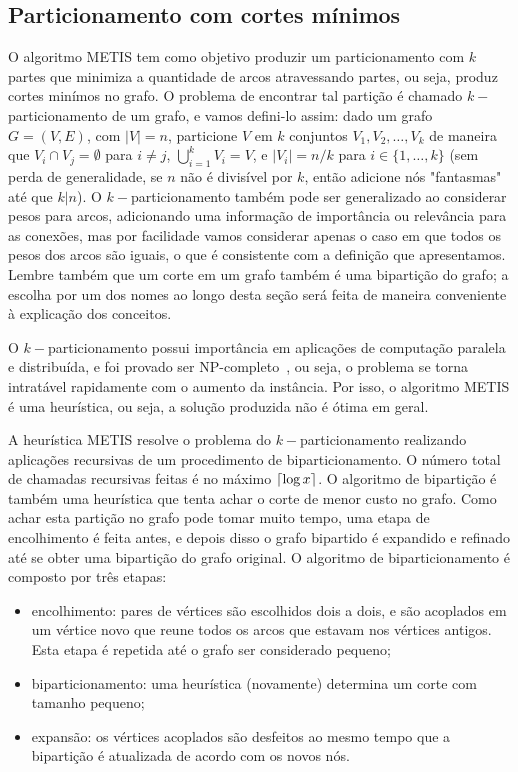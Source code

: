 \documentclass[conference]{IEEEtran}
\DeclarePairedDelimiter\ceil{\lceil}{\rceil}
\begin{document}
\subsection{Particionamento com cortes mínimos}
O algoritmo METIS tem como objetivo produzir um particionamento com
$k$ partes que minimiza a quantidade de arcos atravessando partes, ou
seja, produz cortes minímos no grafo. O problema de encontrar tal
partição é chamado $k-$particionamento de um grafo, e vamos defini-lo
assim: dado um grafo $G = (V, E)$, com $|V| = n$, particione $V$ em $k$
conjuntos $V_1, V_2, \ldots, V_k$ de maneira que
$V_i \cap V_j = \emptyset$ para $i \neq j$, $\bigcup_{i = 1}^k V_i = V$,
e $|V_i| = n / k$ para $i \in \{1, \ldots, k\}$ (sem perda de
generalidade, se $n$ não é divisível por $k$, então adicione nós
"fantasmas" até que $k | n$). O $k-$particionamento também pode ser
generalizado ao considerar pesos para arcos, adicionando uma informação
de importância ou relevância para as conexões, mas por facilidade vamos
considerar apenas o caso em que todos os pesos dos arcos são iguais, o
que é consistente com a definição que apresentamos. Lembre também que
um corte em um grafo também é uma bipartição do grafo; a escolha por um
dos nomes ao longo desta seção será feita de maneira conveniente à
explicação dos conceitos.

O $k-$particionamento possui importância em aplicações de computação
paralela e distribuída, e foi provado ser
NP-completo~\cite{graphpartitioning}, ou seja, o problema se torna
intratável rapidamente com o aumento da instância. Por isso, o algoritmo
METIS é uma heurística, ou seja, a solução produzida não é ótima em
geral.

A heurística METIS resolve o problema do $k-$particionamento realizando
aplicações recursivas de um procedimento de biparticionamento. O número
total de chamadas recursivas feitas é no máximo $\ceil{\log x}$. O
algoritmo de bipartição é também uma heurística que tenta achar o
corte de menor custo no grafo. Como achar esta partição no grafo pode
tomar muito tempo, uma etapa de encolhimento é feita antes, e depois
disso o grafo bipartido é expandido e refinado até se obter uma
bipartição do grafo original. O algoritmo de biparticionamento é
composto por três etapas:
\begin{itemize}
\item{encolhimento:} pares de vértices são escolhidos dois
    a dois, e são acoplados em um vértice novo que reune todos os arcos
    que estavam nos vértices antigos. Esta etapa é repetida até o
    grafo ser considerado pequeno;
\item{biparticionamento:} uma heurística (novamente) determina um corte
    com tamanho pequeno;
\item{expansão:} os vértices acoplados são desfeitos ao mesmo tempo que
    a bipartição é atualizada de acordo com os novos nós.
\end{itemize}
\end{document}

